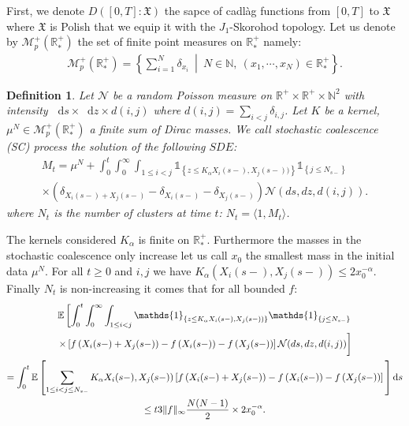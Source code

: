 \documentclass[11pt,a4paper]{article}
\newcommand{\RR}{\mathbb{R}}
\newcommand{\NN}{\mathbb{N}}
\newcommand{\RRP}{\mathbb{R}^+_*}
\newcommand{\MC}{\mathcal{M}}
\newcommand{\NC}{\mathcal{N}}
\newcommand{\XF}{\mathfrak{X}}
\newcommand{\SC}{{\emph{SC}}}
\newcommand{\indic}[1]{\mathds{1}_{\left\lbrace#1\right\rbrace}}
\newcommand{\dd}{\mathop{}\!\mathrm{d}}
\newtheorem{definition}[theorem]{Definition}
\begin{document}
First, we denote $D\left([0,T]: \XF\right)$ the sapce of cadlàg functions from $[0,T]$ to $\XF$ where $\XF$ is Polish that we equip it with the $J_1$-Skorohod topology. Let us denote by $\MC_p^+(\RRP)$ the set of finite point measures on $\RRP$ namely:
\begin{align*}
    \MC_p^+(\RRP) = \left\lbrace \sum\limits_{i = 1}^N \delta_{x_i}\  \middle|\  N\in \NN,\  (x_1,\cdots,x_N) \in \RRP \right\rbrace. 
\end{align*}
\begin{definition}
    Let $\NC$ be a random Poisson measure on $\RR^+ \times \RR^+ \times \NN^2$ with intensity $\dd s \times \dd z \times d(i,j)$ where $d(i,j) = \sum\limits_{i < j} \delta_{i,j}$. Let $K$ be a kernel, $\mu^N \in \MC_p^+(\RRP)$ a finite sum of Dirac masses. We call stochastic coalescence (\SC) process the solution of the following $SDE$:
    \begin{multline*}
        M_t = \mu^N + \int_0^t \int_0^\infty \int_{1 \leq i <j }  \indic{z \leq K_{\alpha}X_{i}(s-),X_{j}(s-))} \indic{j \leq N_{s-}} \\ \times \left(\delta_{X_{i}(s-) + X_{j}(s-)} - \delta_{X_{i}(s-)} - \delta_{X_{j}(s-)}\right)\mathcal{N}(ds,dz,d(i,j)).
    \end{multline*}
    where $N_t$ is the number of clusters at time $t$: $N_t = \langle 1 , M_t\rangle$.
\end{definition}
The kernels considered $K_\alpha$ is finite on $\RRP$. Furthermore the masses in the stochastic coalescence only increase let us call $x_0$ the smallest mass in the initial data $\mu^N$. For all $t \geq 0$ and $i,j$ we have $K_\alpha(X_{i}(s-),X_{j}(s-)) \leq 2x_0^{-\alpha}$. Finally $N_t$ is non-increasing it comes that for all bounded $f$:
\begin{multline*}
    \mathbb{E} \left[ \int_0^t \int_0^\infty \int_{1 \leq i <j }  \indic{z \leq K_{\alpha}X_{i}(s-),X_{j}(s-))} \indic{j \leq N_{s-}}\right. \\
    \left. \times   \left[f\left(X_{i}(s-) + X_{j}(s-)\right) - f\left(X_{i}(s-)\right) - f\left( X_{j}(s-)\right)\right]\mathcal{N}(ds,dz,d(i,j)) \vphantom{\int_0^t \int_0^\infty \int_{i <j } }\right] \\
    = \int_0^t \mathbb{E} \left[\sum\limits_{1 \leq i< j \leq N_{s-}} K_{\alpha}X_{i}(s-),X_{j}(s-)) \left[f\left(X_{i}(s-) + X_{j}(s-)\right) - f\left(X_{i}(s-)\right) - f\left( X_{j}(s-)\right)\right] \vphantom{\int_0^t \int_0^\infty \int_{i <j } } \right] \dd s \\
    \leq t 3\|f\|_{\infty}\dfrac{N(N-1)}{2} \times 2 x_0^{-\alpha} .
\end{multline*}
\end{document}
